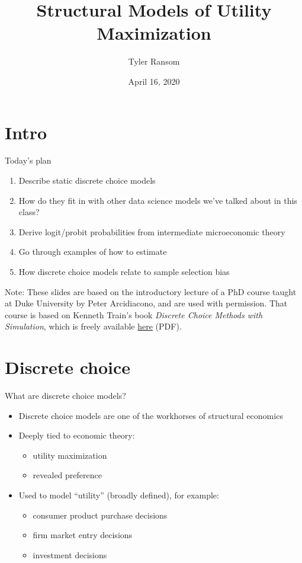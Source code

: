 \documentclass[english,aspectratio=169,12pt,xcolor=dvipsnames]{beamer}
\title{Structural Models of Utility Maximization}
\author{Tyler Ransom}
\institute[OU Econ]{\normalsize{University of Oklahoma, Dept. of Economics}}
\date{April 16, 2020}
\begin{document}
{
\frame[noframenumbering]{\titlepage}
}




\section{Intro}
\begin{frame}{Today's plan}
\begin{enumerate}
\item Describe static discrete choice models
\item How do they fit in with other data science models we've talked about in this class?
\item Derive logit/probit probabilities from intermediate microeconomic theory
\item Go through examples of how to estimate
\item How discrete choice models relate to sample selection bias
\end{enumerate}

\bigskip{}
\bigskip{}

\footnotesize{Note: These slides are based on the introductory lecture of a PhD course taught at Duke University by Peter Arcidiacono, and are used with permission. That course is based on Kenneth Train's book \emph{Discrete Choice Methods with Simulation}, which is freely available \href{https://eml.berkeley.edu/books/train1201.pdf}{here} (PDF).}
\end{frame}



\section{Discrete choice}
\begin{frame}{What are discrete choice models?}
\begin{itemize}
\item Discrete choice models are one of the workhorses of structural economics
\item Deeply tied to economic theory:
    \begin{itemize}
    \item utility maximization
    \item revealed preference
    \end{itemize}
\item Used to model ``utility'' (broadly defined), for example:
    \begin{itemize}
    \item consumer product purchase decisions
    \item firm market entry decisions
    \item investment decisions
    \end{itemize}
\end{itemize}
\end{frame}
\end{document}
